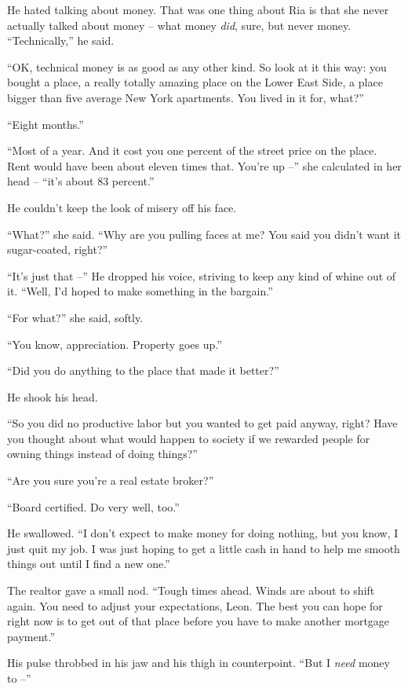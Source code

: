 He hated talking about money. That was one thing about Ria is that she 
never actually talked about money -- what money \emph{did}, sure, but 
never money. “Technically,” he said.

“OK, technical money is as good as any other kind. So look at it this 
way: you bought a place, a really totally amazing place on the Lower 
East Side, a place bigger than five average New York apartments. You 
lived in it for, what?”

“Eight months.”

“Most of a year. And it cost you one percent of the street price on 
the place. Rent would have been about eleven times that. You're up 
--” she calculated in her head -- “it's about 83 percent.”

He couldn't keep the look of misery off his face.

“What?” she said. “Why are you pulling faces at me? You said you 
didn't want it sugar-coated, right?”

“It's just that --” He dropped his voice, striving to keep any kind 
of whine out of it. “Well, I'd hoped to make something in the 
bargain.”

“For what?” she said, softly.

“You know, appreciation. Property goes up.”

“Did you do anything to the place that made it better?”

He shook his head.

“So you did no productive labor but you wanted to get paid anyway, 
right? Have you thought about what would happen to society if we 
rewarded people for owning things instead of doing things?”

“Are you sure you're a real estate broker?”

“Board certified. Do very well, too.”

He swallowed. “I don't expect to make money for doing nothing, but 
you know, I just quit my job. I was just hoping to get a little cash in 
hand to help me smooth things out until I find a new one.”

The realtor gave a small nod. “Tough times ahead. Winds are about to 
shift again. You need to adjust your expectations, Leon. The best you 
can hope for right now is to get out of that place before you have to 
make another mortgage payment.”

His pulse throbbed in his jaw and his thigh in counterpoint. “But I 
\emph{need} money to --”

